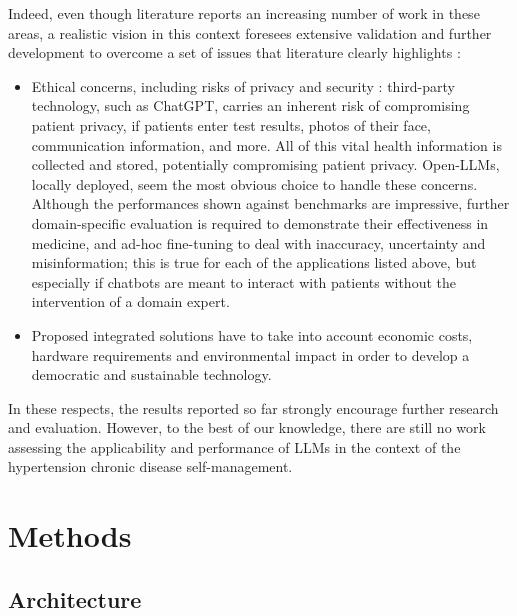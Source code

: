 %
Indeed, even though literature reports an increasing number of work in these areas, a realistic vision in this context foresees extensive validation and further development to overcome a set of issues that literature clearly highlights  \cite{Wang2023,Mesko2023}:
%
\begin{itemize}
    \item Ethical concerns, including risks of privacy and security \cite{lancet2023}: third-party technology, such as ChatGPT, carries an inherent risk of compromising patient privacy, if patients enter test results, photos of their face, communication information, and more. All of this vital health information is collected and stored, potentially compromising patient privacy. 
    Open-LLMs, locally deployed, seem the most obvious choice to handle these concerns.
    Although the performances shown against benchmarks are impressive, further domain-specific evaluation is required to demonstrate their effectiveness in medicine, and ad-hoc fine-tuning to deal with inaccuracy, uncertainty and misinformation; this is true for each of the applications listed above, but especially if chatbots are meant to interact with patients without the intervention of a domain expert.
     
    \item Proposed integrated solutions have to take into account economic costs, hardware requirements and environmental impact in order to develop a democratic and sustainable technology.
    
\end{itemize}
%
In these respects, the results reported so far strongly encourage further research and evaluation. 
%
However, to the best of our knowledge, there are still no work assessing the applicability and performance of LLMs in the context of the hypertension chronic disease self-management.

\section{Methods}



\subsection{Architecture}\label{subsec:archi}

